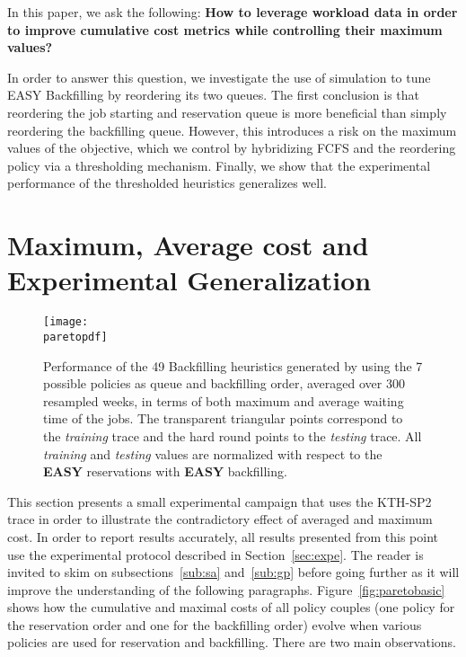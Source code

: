 In this paper, we ask the following: \textbf{How to leverage workload data in
order to improve cumulative cost metrics while controlling their maximum
values?}

In order to answer this question, we investigate the use of simulation to tune
EASY Backfilling by reordering its two queues.  The first conclusion is that
reordering the job starting and reservation queue is more beneficial than
simply reordering the backfilling queue. However, this introduces a risk on the
maximum values of the objective, which we control by hybridizing FCFS and the
reordering policy via a thresholding mechanism.  Finally, we show that the
experimental performance of the thresholded heuristics generalizes well.

\section{Maximum, Average cost and Experimental Generalization}
\label{sec:mmax}


\begin{figure*}[ht!]
  \centering
  \texttt{[image: \\paretopdf]}

  \caption{Performance of the 49 Backfilling heuristics generated by using the
    7 possible policies as queue and backfilling order, averaged over 300
    resampled weeks, in terms of both maximum and average waiting time of the
    jobs. The transparent triangular points correspond to the \textit{training}
    trace and the hard round points to the \textit{testing} trace. All
    \textit{training} and \textit{testing} values are normalized with respect
    to the \textbf{EASY} reservations with \textbf{EASY} backfilling.}

  \label{fig:paretogen}
\end{figure*}

This section presents a small experimental campaign that uses the KTH-SP2 trace
in order to illustrate the contradictory effect of averaged and maximum cost.
In order to report results accurately, all results presented from this point
use the experimental protocol described in Section~\ref{sec:expe}.  The reader
is invited to skim on subsections~\ref{sub:sa} and~\ref{sub:gp} before going
further as it will improve the understanding of the following paragraphs.
Figure~\ref{fig:paretobasic} shows how the cumulative and maximal costs of all
policy couples (one policy for the reservation order and one for the
backfilling order) evolve when various policies are used for reservation and
backfilling. There are two main observations.

